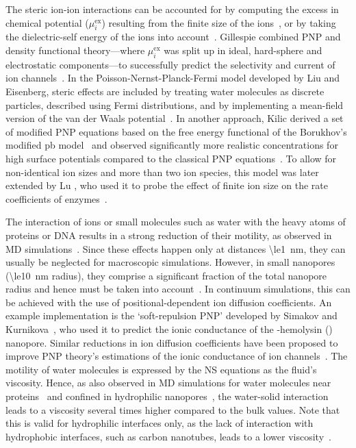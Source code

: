 The steric ion-ion interactions can be accounted for by computing the excess in chemical potential
($\mu_{i}^\text{ex}$) resulting from the finite size of the ions~\cite{Eisenberg-1996,Bazant-2009,
Daiguji-2010}, or by taking the dielectric-self energy of the ions into account~\cite{Corry-2003,
Bonthuis-2006}. Gillespie \etal{} combined PNP and density functional theory---where $\mu_{i}^\text{ex}$ was
split up in ideal, hard-sphere and electrostatic components---to successfully predict the selectivity and
current of ion channels~\cite{Gillespie-2002}. In the Poisson-Nernst-Planck-Fermi model developed by Liu and
Eisenberg, steric effects are included by treating water molecules as discrete particles, described using
Fermi distributions, and by implementing a mean-field version of the van der Waals
potential~\cite{Liu-2013,Liu-2015,Liu-2020}. In another approach, Kilic \etal{} derived a set of modified PNP
equations based on the free energy functional of the Borukhov's modified \gls{pb} model~\cite{Borukhov-1997}
and observed significantly more realistic concentrations for high surface potentials compared to the classical
PNP equations~\cite{Kilic-2007}. To allow for non-identical ion sizes and more than two ion species, this
model was later extended by Lu \etal{}, who used it to probe the effect of finite ion size on the rate
coefficients of enzymes~\cite{Lu-2011}.

The interaction of ions or small molecules such as water with the heavy atoms of proteins or DNA results in a
strong reduction of their motility, as observed in MD simulations~\cite{Makarov-1998,Pronk-2014,Wilson-2019}.
Since these effects happen only at distances \SI{\le1}{\nm}, they can usually be neglected for macroscopic
simulations. However, in small nanopores (\SI{\le10}{\nm} radius), they comprise a significant fraction of the
total nanopore radius and hence must be taken into account~\cite{Noskov-2004,Simakov-2010,Pederson-2015,
McMullen-2017}. In continuum simulations, this can be achieved with the use of positional-dependent ion
diffusion coefficients. An example implementation is the `soft-repulsion PNP' developed by Simakov and
Kurnikova~\cite{Simakov-2010,Simakov-2018}, who used it to predict the ionic conductance of the
\textalpha-hemolysin (\ahl) nanopore. Similar reductions in ion diffusion coefficients have been proposed to
improve PNP theory's estimations of the ionic conductance of ion channels~\cite{Furini-2006,Liu-2015,
DeBiase-2015}. The motility of water molecules is expressed by the NS equations as the fluid's viscosity.
Hence, as also observed in MD simulations for water molecules near proteins~\cite{Pronk-2014} and confined in
hydrophilic nanopores~\cite{Qiao-Aluru-2003,Vo-2016,Hsu-2017}, the water-solid interaction leads to a
viscosity several times higher compared to the bulk values. Note that this is valid for hydrophilic interfaces
only, as the lack of interaction with hydrophobic interfaces, such as carbon nanotubes, leads to a lower
viscosity~\cite{Ye-2011}.

